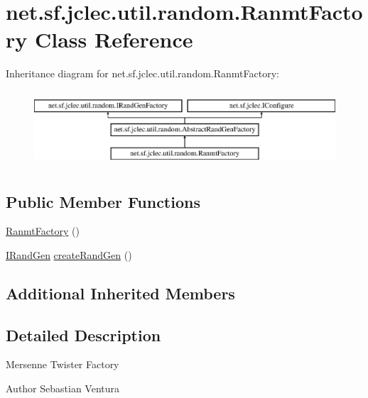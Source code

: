 \hypertarget{classnet_1_1sf_1_1jclec_1_1util_1_1random_1_1_ranmt_factory}{\section{net.\-sf.\-jclec.\-util.\-random.\-Ranmt\-Factory Class Reference}
\label{classnet_1_1sf_1_1jclec_1_1util_1_1random_1_1_ranmt_factory}
}
Inheritance diagram for net.\-sf.\-jclec.\-util.\-random.\-Ranmt\-Factory\-:\begin{figure}[H]
\begin{center}
\leavevmode
\includegraphics[height=2.847458cm]{classnet_1_1sf_1_1jclec_1_1util_1_1random_1_1_ranmt_factory}
\end{center}
\end{figure}
\subsection*{Public Member Functions}
\begin{DoxyCompactItemize}
\item 
\hyperlink{classnet_1_1sf_1_1jclec_1_1util_1_1random_1_1_ranmt_factory_aeca946963ac3b3305f2cd902a8c7175f}{Ranmt\-Factory} ()
\item 
\hyperlink{interfacenet_1_1sf_1_1jclec_1_1util_1_1random_1_1_i_rand_gen}{I\-Rand\-Gen} \hyperlink{classnet_1_1sf_1_1jclec_1_1util_1_1random_1_1_ranmt_factory_afbcc9e8e11c6f6763a373ef8f9835da3}{create\-Rand\-Gen} ()
\end{DoxyCompactItemize}
\subsection*{Additional Inherited Members}


\subsection{Detailed Description}
Mersenne Twister Factory

\begin{DoxyAuthor}{Author}
Sebastian Ventura 
\end{DoxyAuthor}


